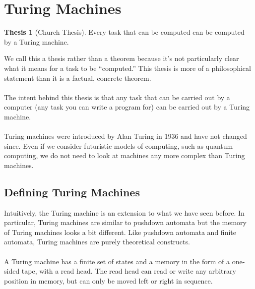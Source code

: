 \documentclass[]{article}
\theoremstyle{definition}
\newtheorem*{thesis}{Thesis}
\newcommand{\lecture}[1]{\marginpar{{\footnotesize $\leftarrow$ \underline{#1}}}}
\begin{document}
  \section{Turing Machines} \lecture{November 12, 2013}
    \begin{thesis}[Church Thesis]
      Every task that can be computed can be computed by a Turing machine.
    \end{thesis}

    We call this a thesis rather than a theorem because it's not particularly clear what it means for a task to be ``computed.'' This thesis is more of a philosophical statement than it is a factual, concrete theorem.
    \\ \\
    The intent behind this thesis is that any task that can be carried out by a computer (any task you can write a program for) can be carried out by a Turing machine.
    \\ \\
    Turing machines were introduced by Alan Turing in 1936 and have not changed since. Even if we consider futuristic models of computing, such as quantum computing, we do not need to look at machines any more complex than Turing machines.

    \subsection{Defining Turing Machines}
      Intuitively, the Turing machine is an extension to what we have seen before. In particular, Turing machines are similar to pushdown automata but the memory of Turing machines looks a bit different. Like pushdown automata and finite automata, Turing machines are purely theoretical constructs.
      \\ \\
      A Turing machine has a finite set of states and a memory in the form of a one-sided tape, with a read head. The read head can read or write any arbitrary position in memory, but can only be moved left or right in sequence.
\end{document}
